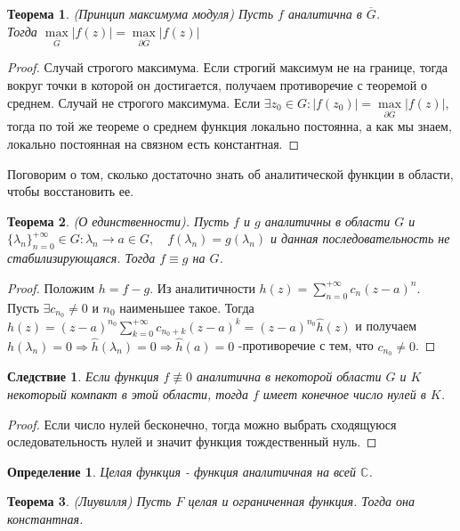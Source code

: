 \documentclass[12pt,a4paper]{article} %
\newtheorem{theorem}{Теорема}
\newtheorem{definition}{Определение}
\newtheorem{consequence}{Следствие}
\newcommand{\Co}{\mathbb{C}}
\begin{document}
	\begin{theorem}
		(Принцип максимума модуля) Пусть $f$ аналитична в $\overline{G}$. \\Тогда $\underset{\overline{G}}{\max}|f(z)|=\underset{\partial\overline{G}}{\max}|f(z)|$
	\end{theorem}
	\begin{proof}
		Случай строгого максимума. Если строгий максимум не на границе, тогда вокруг точки в которой он достигается, получаем противоречие с теоремой о среднем. Случай не строгого максимума. Если $\exists z_0\in G: |f(z_0)|=\underset{\partial\overline{G}}{\max}|f(z)|$, тогда по той же теореме о среднем функция локально постоянна, а как мы знаем, локально постоянная на связном есть константная.
	\end{proof}
	Поговорим о том, сколько достаточно знать об аналитической функции в области, чтобы восстановить ее.
	\begin{theorem}\label{т_единственности}
		(О единственности). Пусть $f$ и $g$ аналитичны в области $G$ и \\$\{\lambda_n\}_{n=0}^{+\infty}\in G: \lambda_n\rightarrow a\in G,\quad f(\lambda_n)=g(\lambda_n)$ и данная последовательность не стабилизирующаяся. Тогда $f\equiv g$ на $G$.
	\end{theorem}
	\begin{proof}
		Положим $h=f-g$. Из аналитичности $h(z)=\displaystyle\sum_{n=0}^{+\infty}c_n (z-a)^n$. Пусть $\exists c_{n_0}\neq 0$ и $n_0$ наименьшее такое. Тогда $h(z)=(z-a)^{n_0}\displaystyle\sum_{k=0}^{+\infty}c_{n_0+k}(z-a)^k=(z-a)^{n_0}\widehat{h}(z)$ и получаем $h(\lambda_n)=0\Rightarrow \widehat{h}(\lambda_n)=0\Rightarrow\widehat{h}(a)=0$ -противоречие с тем, что $c_{n_0}\neq 0$.
	\end{proof}
	\begin{consequence}
		Если функция $f\not\equiv 0$ аналитична в некоторой области $G$ и $K$ некоторый компакт в этой области, тогда $f$ имеет конечное число нулей в $K$.
	\end{consequence}
	\begin{proof}
		Если число нулей бесконечно, тогда можно выбрать сходящуюся оследовательность нулей и значит функция тождественный нуль.
	\end{proof}
	\begin{definition}
		Целая функция - функция аналитичная на всей $\Co$.
	\end{definition}
	\begin{theorem}
		(Лиувилля) Пусть $F$ целая и ограниченная функция. Тогда она константная.
	\end{theorem}
\end{document}
